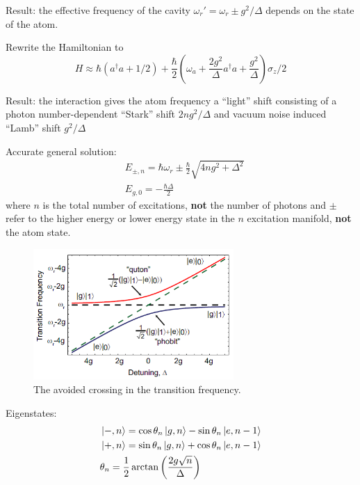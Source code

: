 \documentclass[8pt,a4paper,twocolumn]{article} %
\numberwithin{equation}{section} %
\begin{document}
			Result: the effective frequency of the cavity $ \omega_r'=\omega_r\pm g^2/\Delta $ depends on the state of the atom.

			Rewrite the Hamiltonian to
			\begin{equation}
				H\approx \hbar(a^{\dagger}a+1/2) +\frac{\hbar}{2} \left( \omega_a +\frac{2g^2}{\Delta}a^{\dagger}a + \frac{g^2}{\Delta}\right) \sigma_z /2
			\end{equation}

			Result: the interaction gives the atom frequency a ``light'' shift consisting of a photon number-dependent ``Stark'' shift $ 2ng^2/\Delta $ and vacuum noise induced ``Lamb'' shift $g^2/\Delta $

			Accurate general solution:
			\begin{align}
				&E_{\pm,n}=\hbar \omega_r\pm \frac{\hbar}{2} \sqrt{4ng^2+\Delta^2}\\
				&E_{g,0}=-\frac{\hbar \Delta}{2}
			\end{align}
			where $n$ is the total number of excitations, \textbf{not} the number of photons and $\pm$ refer to the higher energy or lower energy state in the $n$ excitation manifold, \textbf{not} the atom state.

			\begin{figure}[!h]
				\centering
				\includegraphics[width=3in]{avoidedCross.png}
				\caption{The avoided crossing in the transition frequency. \cite{Schuster2007}}
				\label{pic:avoidedCross}
			\end{figure}

			Eigenstates:
			\begin{align}
				& \ket{-,n} = \cos \theta_n \ket{g,n} -\sin \theta_n \ket{e,n-1}\\
				& \ket{+,n} = \sin \theta_n \ket{g,n} + \cos \theta_n \ket{e,n-1}\\
				& \theta_n = \frac{1}{2} \arctan \left( \frac{2g\sqrt n}{\Delta} \right)
			\end{align}
\end{document}

